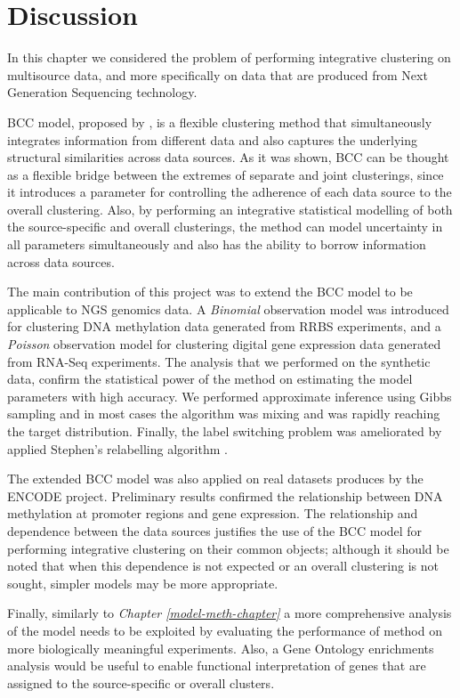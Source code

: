 \section{Discussion} \label{integr-discussion-sect}
In this chapter we considered the problem of performing integrative clustering on multisource data, and more specifically on data that are produced from Next Generation Sequencing technology.

BCC model, proposed by \citet{Lock2013}, is a flexible clustering method that simultaneously integrates information from different data and also captures the underlying structural similarities across data sources. As it was shown, BCC can be thought as a flexible bridge between the extremes of separate and joint clusterings, since it introduces a parameter for controlling the adherence of each data source to the overall clustering. Also, by performing an integrative statistical modelling of both the source-specific and overall clusterings, the method can model uncertainty in all parameters simultaneously and also has the ability to borrow information across data sources.

The main contribution of this project was to extend the BCC model to be applicable to NGS genomics data. A \emph{Binomial} observation model was introduced for clustering DNA methylation data generated from RRBS experiments, and a \emph{Poisson} observation model for clustering digital gene expression data generated from RNA-Seq experiments. The analysis that we performed on the synthetic data, confirm the statistical power of the method on estimating the model parameters with high accuracy. We performed approximate inference using Gibbs sampling and in most cases the algorithm was mixing and was rapidly reaching the target distribution. Finally, the label switching problem was ameliorated by applied Stephen's relabelling algorithm \citep{Stephens2000}.

The extended BCC model was also applied on real datasets produces by the ENCODE project. Preliminary results confirmed the relationship between DNA methylation at promoter regions and gene expression. The relationship and dependence between the data sources justifies the use of the BCC model for performing integrative clustering on their common objects; although it should be noted that when this dependence is not expected or an overall clustering is not sought, simpler models may be more appropriate. 

Finally, similarly to \emph{Chapter \ref{model-meth-chapter}} a more comprehensive analysis of the model needs to be exploited by evaluating the performance of method on more biologically meaningful experiments. Also, a Gene Ontology enrichments analysis would be useful to enable functional interpretation of genes that are assigned to the source-specific or overall clusters.